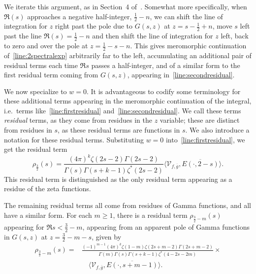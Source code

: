 We iterate this argument, as in Section~4 of~\cite[p. 481-483]{HoffsteinHulse13}.
Somewhat more specifically, when $\Re(s)$ approaches a negative half-integer,
$\frac{1}{2}-n$, we can shift the line of integration for $z$ right past the pole due to
$G(s,z)$ at $z=s-\frac{1}{2}+n$, move $s$ left past the line $\Re(s)=\frac{1}{2}-n$ and
then shift the line of integration for $z$ left, back to zero and over the pole at
$z=\frac{1}{2}-s-n$.
This gives meromorphic continuation of~\eqref{line:2spectralexp} arbitrarily far to the
left, accumulating an additional pair of residual terms each time $\Re s$ passes a
half-integer, and of a similar form to the first residual term coming from $G(s,z)$,
appearing in~\eqref{line:secondresidual}.


We now specialize to $w = 0$.
It is advantageous to codify some terminology for these additional terms appearing in the
meromorphic continuation of the integral, i.e.\ terms like~\eqref{line:firstresidual}
and~\eqref{line:secondresidual}.
We call these terms \emph{residual} terms, as they come from residues in the $z$ variable;
these are distinct from residues in $s$, as these residual terms are functions in $s$.
We also introduce a notation for these residual terms.
Substituting $w = 0$ into~\eqref{line:firstresidual}, we get the residual term
\begin{equation}\label{eq:residual_0}
  \rho_{\frac{3}{2}}(s) = \frac{(4\pi)^k \zeta(2s - 2)\Gamma(2s - 2)}{\Gamma(s) \Gamma(s +
  k - 1) \zeta^*(2s - 2)} \langle \mathcal{V}_{f, \overline{g}}, \overline{E(\cdot, 2 -
s)} \rangle.
\end{equation}
This residual term is distinguished as the only residual term appearing as a residue of
the zeta functions.


The remaining residual terms all come from residues of Gamma functions, and all have a
similar form.
For each $m \geq 1$, there is a residual term $\rho_{\frac{3}{2} - m}(s)$ appearing for
$\Re s < \tfrac{3}{2} - m$, appearing from an apparent pole of Gamma functions in $G(s,z)$
at $z = \tfrac{3}{2} - m - s$, given by
\begin{equation}\label{eq:residual_m}
  \begin{split}
    \rho_{\frac{3}{2} - m}(s) = &\frac{(-1)^{m-1}(4\pi)^k \zeta(1 - m) \zeta(2s + m - 2)
    \Gamma(2s + m - 2)}{\Gamma(m) \Gamma(s) \Gamma(s + k - 1) \zeta^*(4 - 2s - 2m)} \times
    \\
    &\quad\langle \mathcal{V}_{f, \overline{g}}, \overline{E(\cdot, s + m - 1)}\rangle.
  \end{split}
\end{equation}


